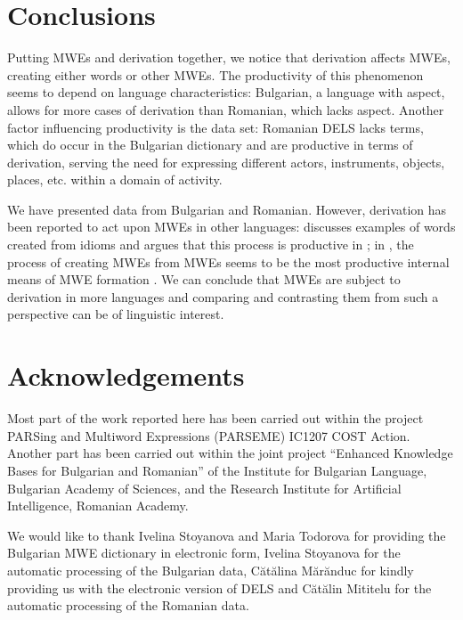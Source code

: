 \documentclass[output=paper]{langsci/langscibook}
\begin{document}
\section{Conclusions}

Putting MWEs and derivation together, we notice that derivation affects
MWEs, creating either words or other MWEs. The productivity of this
phenomenon seems to depend on language characteristics: Bulgarian, a
language with aspect, allows for more cases of derivation than
Romanian, which lacks aspect. Another factor influencing productivity
is the data set: Romanian DELS lacks terms, which do occur in the
Bulgarian dictionary and are productive in terms of derivation, serving
the need for expressing different actors, instruments, objects, places,
etc. within a domain of activity.



We have presented data from Bulgarian and Romanian. However,  derivation has been reported to act upon MWEs in other 
languages: \cite{piela2007} discusses examples of words created from
idioms and argues that this process is productive in ; in
, the process of creating MWEs from  MWEs seems to be
the most productive internal means of MWE formation \citep{ermakova2015}. We can conclude that MWEs are subject to derivation in more
languages and comparing and contrasting them from such a perspective
can be of linguistic \nolinebreak interest.



 

\section[Acknowledgements]{Acknowledgements}

Most part of the work reported here has been carried out within the project PARSing
and Multiword Expressions (PARSEME) IC1207 COST Action. Another part
has been carried out within the joint project “Enhanced Knowledge Bases
for Bulgarian and Romanian” of the Institute for Bulgarian Language,
Bulgarian Academy of Sciences, and the Research Institute for
Artificial Intelligence, Romanian  Academy.



We would like to thank Ivelina Stoyanova and Maria Todorova for
providing the Bulgarian MWE dictionary in electronic form, Ivelina
Stoyanova for the automatic processing of the Bulgarian data, Cătălina
Mărănduc for kindly providing us with the electronic version of DELS
and Cătălin Mititelu for the automatic processing of the Romanian data.
\end{document}
